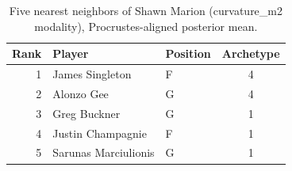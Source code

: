 \begin{table}[htbp]
  \centering\small
  \begin{tabular}{rllc}
    \toprule
    Rank & Player & Position & Archetype \\
    \midrule
    1 & James Singleton & F & 4 \\
    2 & Alonzo Gee & G & 4 \\
    3 & Greg Buckner & G & 1 \\
    4 & Justin Champagnie & F & 1 \\
    5 & Sarunas Marciulionis & G & 1 \\
    \bottomrule
  \end{tabular}
  \caption{Five nearest neighbors of Shawn Marion (curvature_m2 modality), Procrustes-aligned posterior mean.}
  \label{tab:Shawn_Marion_neighbors_curvature_m2}
\end{table}

